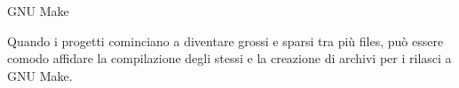 \begin{slide}{GNU Make}
{\small
Quando i progetti cominciano a diventare grossi e sparsi tra più files,
può essere comodo affidare la compilazione degli stessi e la creazione
di archivi per i rilasci a GNU Make.

}
\end{slide}
